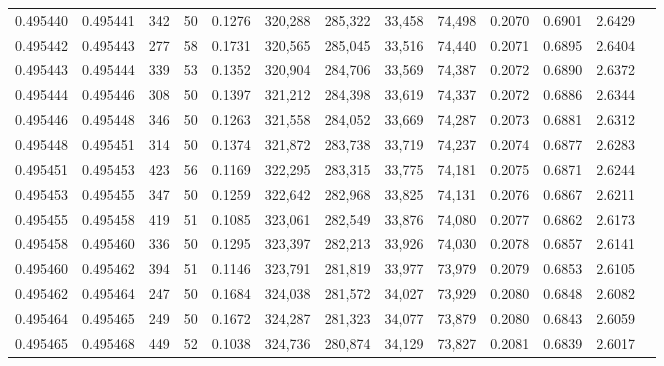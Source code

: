 \begin{tabular}{rrrrrrrrrrrrr}
0.495440 & 0.495441 &   342 &  50 &                                     0.1276 & 320,288 & 285,322 &  33,458 &  74,498 & 0.2070 & 0.6901 & 2.6429 \\
0.495442 & 0.495443 &   277 &  58 &                                     0.1731 & 320,565 & 285,045 &  33,516 &  74,440 & 0.2071 & 0.6895 & 2.6404 \\
0.495443 & 0.495444 &   339 &  53 &                                     0.1352 & 320,904 & 284,706 &  33,569 &  74,387 & 0.2072 & 0.6890 & 2.6372 \\
0.495444 & 0.495446 &   308 &  50 &                                     0.1397 & 321,212 & 284,398 &  33,619 &  74,337 & 0.2072 & 0.6886 & 2.6344 \\
0.495446 & 0.495448 &   346 &  50 &                                     0.1263 & 321,558 & 284,052 &  33,669 &  74,287 & 0.2073 & 0.6881 & 2.6312 \\
0.495448 & 0.495451 &   314 &  50 &                                     0.1374 & 321,872 & 283,738 &  33,719 &  74,237 & 0.2074 & 0.6877 & 2.6283 \\
0.495451 & 0.495453 &   423 &  56 &                                     0.1169 & 322,295 & 283,315 &  33,775 &  74,181 & 0.2075 & 0.6871 & 2.6244 \\
0.495453 & 0.495455 &   347 &  50 &                                     0.1259 & 322,642 & 282,968 &  33,825 &  74,131 & 0.2076 & 0.6867 & 2.6211 \\
0.495455 & 0.495458 &   419 &  51 &                                     0.1085 & 323,061 & 282,549 &  33,876 &  74,080 & 0.2077 & 0.6862 & 2.6173 \\
0.495458 & 0.495460 &   336 &  50 &                                     0.1295 & 323,397 & 282,213 &  33,926 &  74,030 & 0.2078 & 0.6857 & 2.6141 \\
0.495460 & 0.495462 &   394 &  51 &                                     0.1146 & 323,791 & 281,819 &  33,977 &  73,979 & 0.2079 & 0.6853 & 2.6105 \\
0.495462 & 0.495464 &   247 &  50 &                                     0.1684 & 324,038 & 281,572 &  34,027 &  73,929 & 0.2080 & 0.6848 & 2.6082 \\
0.495464 & 0.495465 &   249 &  50 &                                     0.1672 & 324,287 & 281,323 &  34,077 &  73,879 & 0.2080 & 0.6843 & 2.6059 \\
0.495465 & 0.495468 &   449 &  52 &                                     0.1038 & 324,736 & 280,874 &  34,129 &  73,827 & 0.2081 & 0.6839 & 2.6017 \\

\end{tabular}
